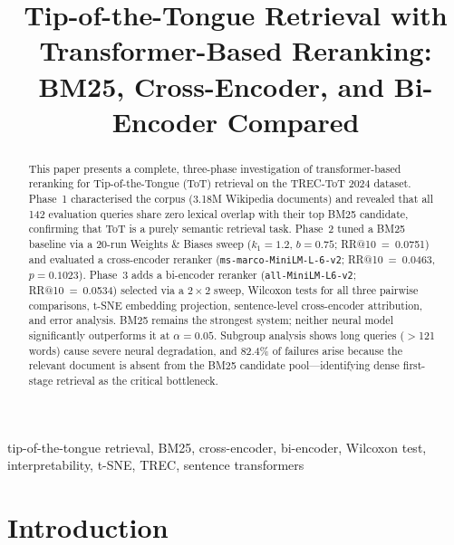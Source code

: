 \documentclass[conference]{IEEEtran}
\begin{document}
\title{Tip-of-the-Tongue Retrieval with Transformer-Based Reranking:\\
BM25, Cross-Encoder, and Bi-Encoder Compared}

\author{
}

\maketitle

\begin{abstract}
This paper presents a complete, three-phase investigation of transformer-based reranking
for Tip-of-the-Tongue (ToT) retrieval on the TREC-ToT 2024 dataset.
Phase~1 characterised the corpus (3.18M Wikipedia documents) and revealed that all 142
evaluation queries share zero lexical overlap with their top BM25 candidate, confirming
that ToT is a purely semantic retrieval task.
Phase~2 tuned a BM25 baseline via a 20-run Weights \& Biases sweep
($k_1=1.2$, $b=0.75$; RR@10~=~0.0751) and evaluated a cross-encoder reranker
(\texttt{ms-marco-MiniLM-L-6-v2}; RR@10~=~0.0463, $p=0.1023$).
Phase~3 adds a bi-encoder reranker (\texttt{all-MiniLM-L6-v2}; RR@10~=~0.0534)
selected via a $2\times2$ sweep, Wilcoxon tests for all three pairwise comparisons,
t-SNE embedding projection, sentence-level cross-encoder attribution, and error analysis.
BM25 remains the strongest system; neither neural model significantly outperforms it
at $\alpha=0.05$.
Subgroup analysis shows long queries ($>$121 words) cause severe neural degradation,
and 82.4\% of failures arise because the relevant document is absent from the BM25
candidate pool---identifying dense first-stage retrieval as the critical bottleneck.
\end{abstract}

\begin{IEEEkeywords}
tip-of-the-tongue retrieval, BM25, cross-encoder, bi-encoder, Wilcoxon test,
interpretability, t-SNE, TREC, sentence transformers
\end{IEEEkeywords}

\section{Introduction}
\end{document}
